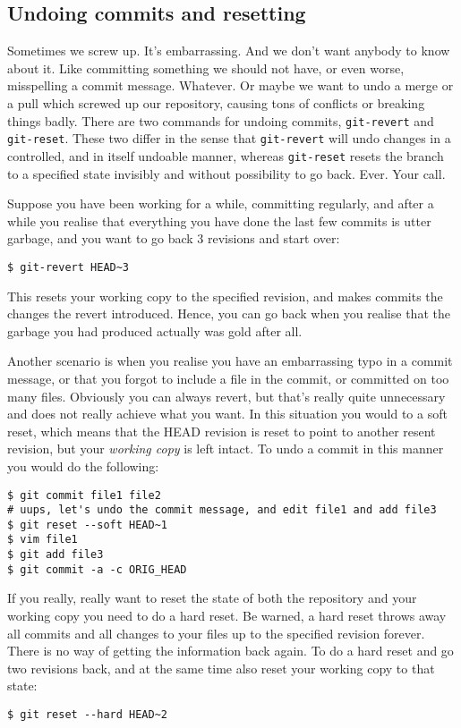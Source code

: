\documentclass[a4paper,10pt]{article}
\begin{document}
\subsection{Undoing commits and resetting}
Sometimes we screw up. It's embarrassing. And we don't want anybody to know
about it. Like committing something we should not have, or even worse,
misspelling a commit message. Whatever. Or maybe we want to undo a merge or a
pull which screwed up our repository, causing tons of conflicts or breaking
things badly. There are two commands for undoing commits, \texttt{git-revert}
and \texttt{git-reset}. These two differ in the sense that \texttt{git-revert}
will undo changes in a controlled, and in itself undoable manner, whereas
\texttt{git-reset} resets the branch to a specified state invisibly and
without possibility to go back. Ever. Your call.

Suppose you have been working for a while, committing regularly, and after a
while you realise that everything you have done the last few commits is utter
garbage, and you want to go back 3 revisions and start over:
\begin{verbatim}
$ git-revert HEAD~3
\end{verbatim}
This resets your working copy to the specified revision, and makes commits the
changes the revert introduced. Hence, you can go back when you realise that
the garbage you had produced actually was gold after all.

Another scenario is when you realise you have an embarrassing typo in a commit
message, or that you forgot to include a file in the commit, or committed on
too many files. Obviously you can always revert, but that's really quite
unnecessary and does not really achieve what you want. In this situation you
would to a soft reset, which means that the HEAD revision is reset to point to 
another resent revision, but your \emph{working copy} is left intact. To undo
a commit in this manner you would do the following:
\begin{verbatim}
$ git commit file1 file2 
# uups, let's undo the commit message, and edit file1 and add file3 
$ git reset --soft HEAD~1  
$ vim file1 
$ git add file3
$ git commit -a -c ORIG_HEAD
\end{verbatim}

If you really, really want to reset the state of both the repository and your
working copy you need to do a hard reset. Be warned, a hard reset throws away
all commits and all changes to your files up to the specified revision forever. 
There is no way of getting the information back again. To do a hard reset and
go two revisions back, and at the same time also reset your working copy to
that state:
\begin{verbatim}
$ git reset --hard HEAD~2
\end{verbatim}
\end{document}
